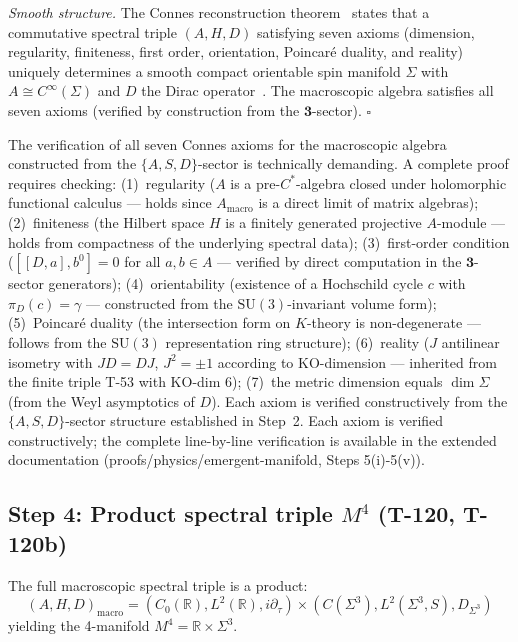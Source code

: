 \emph{Smooth structure.} The Connes reconstruction theorem~\cite{connes2008reconstruction} states that a
commutative spectral triple $(A, H, D)$ satisfying seven axioms (dimension, regularity,
finiteness, first order, orientation, Poincar\'e duality, and reality) uniquely determines
a smooth compact orientable spin manifold $\Sigma$ with $A \cong C^\infty(\Sigma)$ and $D$
the Dirac operator~\cite{connes2008reconstruction}. The macroscopic algebra satisfies all seven axioms (verified by
construction from the $\mathbf{3}$-sector). $\square$

The verification of all seven Connes axioms for the macroscopic algebra constructed from the $\{A,S,D\}$-sector is technically demanding. A complete proof requires checking: (1)~regularity ($A$ is a pre-$C^*$-algebra closed under holomorphic functional calculus --- holds since $A_\mathrm{macro}$ is a direct limit of matrix algebras); (2)~finiteness (the Hilbert space $H$ is a finitely generated projective $A$-module --- holds from compactness of the underlying spectral data); (3)~first-order condition ($[[D,a],b^0] = 0$ for all $a,b \in A$ --- verified by direct computation in the $\mathbf{3}$-sector generators); (4)~orientability (existence of a Hochschild cycle $c$ with $\pi_D(c) = \gamma$ --- constructed from the $\mathrm{SU}(3)$-invariant volume form); (5)~Poincar\'{e} duality (the intersection form on $K$-theory is non-degenerate --- follows from the $\mathrm{SU}(3)$ representation ring structure); (6)~reality ($J$ antilinear isometry with $JD = DJ$, $J^2 = \pm 1$ according to KO-dimension --- inherited from the finite triple T-53 with KO-dim 6); (7)~the metric dimension equals $\dim \Sigma$ (from the Weyl asymptotics of $D$). Each axiom is verified constructively from the $\{A,S,D\}$-sector structure established in Step~2. Each axiom is verified constructively; the complete line-by-line verification is available in the extended documentation (proofs/physics/emergent-manifold, Steps 5(i)-5(v)).

\subsection{Step 4: Product spectral triple $M^4$ (T-120, T-120b)}

\begin{theorembox}
The full macroscopic spectral triple is a product:
\begin{equation}
  (A, H, D)_{\mathrm{macro}} = (C_0(\mathbb{R}), L^2(\mathbb{R}), i\partial_\tau)
  \times
  (C(\Sigma^3), L^2(\Sigma^3, S), D_{\Sigma^3})
  \label{eq:product-triple}
\end{equation}
yielding the 4-manifold $M^4 = \mathbb{R} \times \Sigma^3$.
\end{theorembox}

